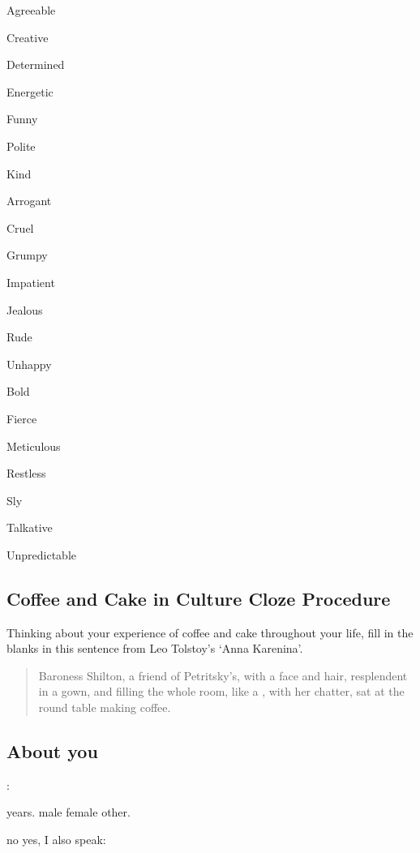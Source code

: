 \documentclass[a4paper,10pt]{article}
\begin{document}
\begin{multicols}{3}
    \begin{Qlist}
        \item Agreeable
        \item Creative
        \item Determined
        \item Energetic
        \item Funny
        \item Polite
        \item Kind
    \end{Qlist}
    \begin{Qlist}
        \item Arrogant
        \item Cruel
        \item Grumpy
        \item Impatient
        \item Jealous
        \item Rude
        \item Unhappy
    \end{Qlist}
    \begin{Qlist}
        \item Bold
        \item Fierce
        \item Meticulous
        \item Restless
        \item Sly
        \item Talkative
        \item Unpredictable
    \end{Qlist}
\end{multicols}

\subsection*{Coffee and Cake in Culture Cloze Procedure}

Thinking about your experience of coffee and cake throughout your life,
fill in the blanks in this sentence from Leo Tolstoy's `Anna Karenina'.

\begin{quote}
Baroness Shilton, a friend of Petritsky’s, with a \Qline{3cm} face and \Qline{3cm} hair, resplendent in a \Qline{3cm} gown, 
and filling the whole room, like a \Qline{3cm}, with her \Qline{3cm} chatter, sat at the round table making coffee.
\end{quote}

\subsection*{About you}

: \Qline{12cm}

 \Qline{2cm} years. \hfil {}
\QO{} male \QO{} female \QO{} other. 

 \hfil \QO{} no \hfil \QO{} yes, I also speak: \Qline{4cm}
\end{document}
